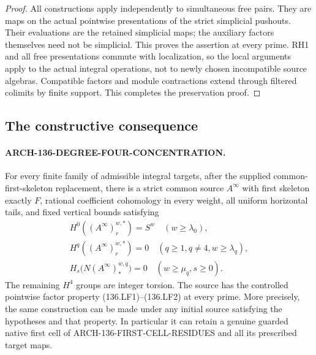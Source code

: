 \begin{proof}
All constructions apply independently to simultaneous free
pairs. They are maps on the actual pointwise presentations of
the strict simplicial pushouts. Their evaluations are the retained
simplicial maps; the auxiliary factors themselves need not be
simplicial. This proves the assertion at every prime. RH1 and
all free presentations commute with localization, so the local
arguments apply to the actual integral operations, not to newly
chosen incompatible source algebras. Compatible factors and
module contractions extend through filtered colimits by finite
support. This completes the preservation proof.
\end{proof}

\subsection{The constructive consequence}

\paragraph{ARCH-136-DEGREE-FOUR-CONCENTRATION.}
For every finite family of admissible integral targets, after
the supplied common-first-skeleton replacement, there is a strict
common source \(A^\infty\) with first skeleton exactly \(F\),
rational coefficient cohomology in every weight, all uniform
horizontal tails, and fixed vertical bounds satisfying
\[
\begin{gathered}
 H^0((A^\infty)_r^{w,*})=S^w\quad(w\geq\lambda_0),\\
 H^q((A^\infty)_r^{w,*})=0
       \quad(q\geq1, q\ne4, w\geq\lambda_q),\\
 H_s\bigl(N(A^\infty)_*^{w,q}\bigr)=0
       \quad(w\geq\mu_q, s\geq0).
\end{gathered}                                             \tag{136.LF12}
\]
The remaining \(H^4\) groups are integer torsion. The source
has the controlled pointwise factor property (136.LF1)--(136.LF2)
at every prime. More precisely, the same construction can be made
under any initial source satisfying the hypotheses and that property.
In particular it can retain a genuine guarded native first cell
of ARCH-136-FIRST-CELL-RESIDUES and all its prescribed target maps.

